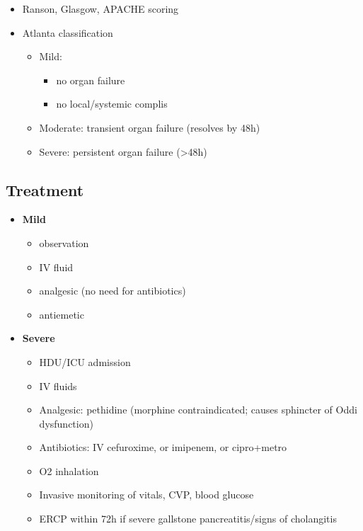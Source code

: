 \documentclass[
  12pt,
]{memoir}
\providecommand{\tightlist}{%
  \setlength{\itemsep}{0pt}\setlength{\parskip}{0pt}}
\begin{document}
\begin{itemize}
\tightlist
\item
  Ranson, Glasgow, APACHE scoring
\item
  Atlanta classification

  \begin{itemize}
  \tightlist
  \item
    Mild:

    \begin{itemize}
    \tightlist
    \item
      no organ failure
    \item
      no local/systemic complis
    \end{itemize}
  \item
    Moderate: transient organ failure (resolves by 48h)
  \item
    Severe: persistent organ failure (\textgreater48h)
  \end{itemize}
\end{itemize}

\hypertarget{treatment-9}{%
\subsection{Treatment}\label{treatment-9}}

\begin{itemize}
\tightlist
\item
  \textbf{Mild}

  \begin{itemize}
  \tightlist
  \item
    observation
  \item
    IV fluid
  \item
    analgesic (no need for antibiotics)
  \item
    antiemetic
  \end{itemize}
\item
  \textbf{Severe}

  \begin{itemize}
  \tightlist
  \item
    HDU/ICU admission
  \item
    IV fluids
  \item
    Analgesic: pethidine (morphine contraindicated; causes sphincter of
    Oddi dysfunction)
  \item
    Antibiotics: IV cefuroxime, or imipenem, or cipro+metro
  \item
    O2 inhalation
  \item
    Invasive monitoring of vitals, CVP, blood glucose
  \item
    ERCP within 72h if severe gallstone pancreatitis/signs of
    cholangitis
  \end{itemize}
\end{itemize}
\end{document}
